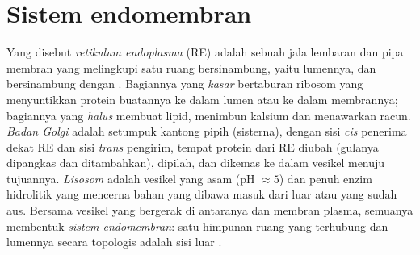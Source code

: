 \section{Sistem endomembran}

\begin{definition}\label{def:b1:eukaryotic-cell:endomembrane}
Yang disebut \emph{retikulum endoplasma}
(RE) adalah sebuah jala lembaran dan pipa membran yang melingkupi satu
ruang bersinambung, yaitu lumennya, dan bersinambung dengan . Bagiannya yang \emph{kasar}
bertaburan ribosom yang menyuntikkan protein buatannya ke dalam lumen
atau ke dalam membrannya; bagiannya yang \emph{halus}
membuat lipid, menimbun kalsium dan menawarkan racun.
\emph{Badan Golgi} adalah setumpuk kantong pipih
(sisterna), dengan sisi \emph{cis} penerima dekat RE dan sisi
\emph{trans} pengirim, tempat protein dari RE diubah (gulanya dipangkas
dan ditambahkan), dipilah, dan dikemas ke dalam vesikel menuju
tujuannya. \emph{Lisosom} adalah vesikel yang asam (pH
$\approx 5$) dan penuh enzim hidrolitik yang mencerna bahan yang dibawa
masuk dari luar atau  yang sudah aus. Bersama vesikel yang
bergerak di antaranya dan membran plasma, semuanya membentuk \emph{sistem
endomembran}: satu himpunan ruang yang
terhubung dan lumennya secara topologis adalah sisi luar .
\end{definition}

